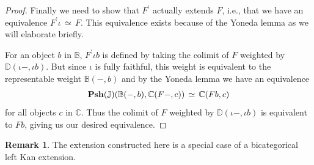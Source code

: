\documentclass[12pt,oneside,reqno,a4paper]{article}
\theoremstyle{definition}
\newtheorem{remark}[theorem]{Remark}
\newcommand{\Psh}[1]{\textbf{\textup{Psh}}(#1)}
\renewcommand{\equiv}{\,\simeq\,}
\newcommand{\bB}{\mathbb{B}}
\newcommand{\bC}{\mathbb{C}}
\newcommand{\bD}{\mathbb{D}}
\newcommand{\bJ}{\mathbb{J}}
\newcommand{\p}{^\prime}
\begin{document}
\begin{proof}
Finally we need to show that $F\p$ actually extends $F$, i.e., that we have an equivalence $F\p\iota \equiv F$. This equivalence exists because of the Yoneda lemma as we will elaborate briefly.

For an object $b$ in $\bB$, $F\p \iota b$ is defined by taking the colimit of $F$ weighted by $\bD(\iota-,\iota b)$. But since $\iota$ is fully faithful, this weight is equivalent to the representable weight $\bB(-,b)$ and by the Yoneda lemma we have an equivalence
\begin{align*}
\Psh{\bJ}(\bB(-,b),\bC(F-,c))\equiv \bC(Fb,c)
\end{align*}
for all objects $c$ in $\bC$. Thus the colimit of $F$ weighted by $\bD(\iota-,\iota b)$ is equivalent to $Fb$, giving us our desired equivalence.
\end{proof}

\begin{remark}
The extension constructed here is a special case of a bicategorical left Kan extension.
\end{remark}



\end{document}
